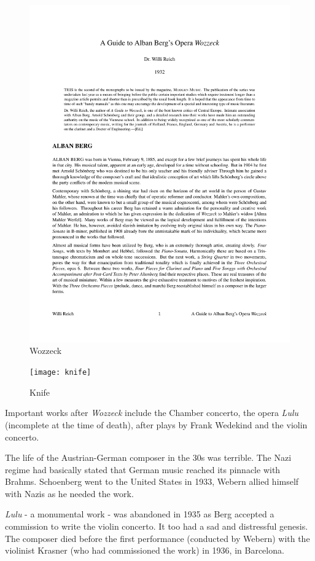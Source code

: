 \begin{figure}[H]
\centering
\includegraphics[scale=0.2]{wozzeck}\caption{Wozzeck}
\label{fig:wozzeck}
\end{figure}



\begin{figure}[H]
\centering
\texttt{[image: knife]}\caption{Knife}
\label{fig:knife}
\end{figure}

Important works after \textit{Wozzeck} include the Chamber concerto, the opera \textit{Lulu} (incomplete at the time of death), after plays by Frank Wedekind and the violin concerto.

The life of the Austrian-German composer in the 30s was terrible. The Nazi regime had basically stated that German music reached its pinnacle with Brahms. Schoenberg went to the United States in 1933, Webern allied himself with Nazis as he needed the work. 

\textit{Lulu} - a monumental work - was abandoned in 1935 as Berg accepted a commission to write the violin concerto. It too had a sad and distressful genesis. The composer died before the first performance (conducted by Webern) with the violinist Krasner (who had commissioned the work) in 1936, in Barcelona.  
 
